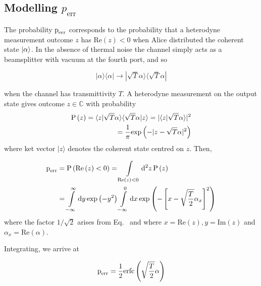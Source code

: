\subsection{Modelling $p_{\text{err}}$}

The probability $\text{p}_{\text{err}}$ corresponds to the probability that a heterodyne measurement outcome $z$ has $\text{Re}\left(z\right) < 0$ when Alice distributed the coherent state $\ket{\alpha}$. In the absence of thermal noise the channel simply acts as a beamsplitter with vacuum at the fourth port, and so

\begin{equation}
|\alpha\rangle\langle\alpha| \rightarrow |\sqrt{T}\alpha\rangle\langle\sqrt{T}\alpha|
\end{equation}

\noindent when the channel has transmittivity $T$.  A heterodyne measurement on the output state gives outcome $z \in \mathbb{C}$ with probability
\begin{align}
\text{P}\left(z\right) = \langle z | \sqrt{T}\alpha\rangle\langle\sqrt{T}\alpha|z\rangle = |\langle z | \sqrt{T} \alpha \rangle |^2& \notag \\
= \frac{1}{\pi}\text{exp}\left( - | z - \sqrt{T}\alpha |^2 \right)&
\end{align}
where ket vector $|z\rangle$ denotes the coherent state centred on $z$. Then,

\begin{align}
\text{p}_{\text{err}} &= \text{P}\left(\text{Re}\left(z\right)<0\right) = \int\limits_{\text{Re}\left(z\right)<0}\mathop{}\!\mathrm{d^2} z \, \text{P}\left(z\right) \notag \\
&= \int\limits_{-\infty}^{\infty} \mathrm{d} y \, \text{exp}\left(-y^2\right) \int\limits_{-\infty}^{0} \mathrm{d} x \, \text{exp}\left(-\left[x - \sqrt{\frac{T}{2}}\alpha_x\right]^2\right)
\end{align}
where the factor $1/\sqrt{2}$ arises from Eq.~ %
and where $x = \text{Re}\left(z\right), y = \text{Im}\left(z\right)$ and $\alpha_x = \text{Re}\left(\alpha\right)$. 

Integrating, we arrive at

\begin{equation}\label{eqn:perr}
\text{p}_{\text{err}} = \frac{1}{2}\text{erfc}\left(\sqrt{\frac{T}{2}}\alpha\right)
\end{equation}

